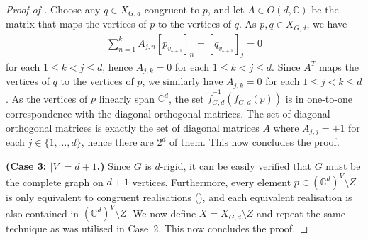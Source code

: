 \documentclass[11pt]{article}
\theoremstyle{definition}
\numberwithin{equation}{section}
\begin{document}
\begin{proof}[Proof of ]
	Choose any $q \in X_{G,d}$ congruent to $p$,
	and let $A \in O(d,\mathbb{C})$ be the matrix that maps the vertices of $p$ to the vertices of $q$.
	As $p,q \in X_{G,d}$, we have 
	\begin{align*}
		\sum_{n=1}^k A_{j,n} [p_{v_{k+1}}]_n = [q_{v_{k+1}}]_j = 0
	\end{align*}
	for each $1 \leq k < j \leq d$,
	hence $A_{j,k}=0$ for each $1 \leq k < j \leq d$.
	Since $A^T$ maps the vertices of $q$ to the vertices of $p$,
	we similarly have $A_{j,k}=0$ for each $1 \leq j < k \leq d$.
	As the vertices of $p$ linearly span $\mathbb{C}^d$,
	the set $\tilde{f}_{G,d}^{-1}\left(f_{G,d}(p) \right)$ is in one-to-one correspondence with the diagonal orthogonal matrices.
	The set of diagonal orthogonal matrices is exactly the set of diagonal matrices $A$ where $A_{j,j} = \pm 1$ for each $j \in \{1,\ldots, d\}$,
	hence there are $2^d$ of them.
	This now concludes the proof.
	
	\textbf{(Case 3: $|V| =d+1$.)}	
	Since $G$ is $d$-rigid, it can be easily verified that $G$ must be the complete graph on $d+1$ vertices.
	Furthermore,
	every element $p \in (\mathbb{C}^d)^V \setminus Z$ is only equivalent to congruent realisations (\cite[Corollary 8]{Gortler2014}),
	and each equivalent realisation is also contained in $(\mathbb{C}^d)^V \setminus Z$.
	We now define $X = X_{G,d} \setminus Z$ and repeat the same technique as was utilised in Case~2.
	This now concludes the proof.
\end{proof}
\end{document}
